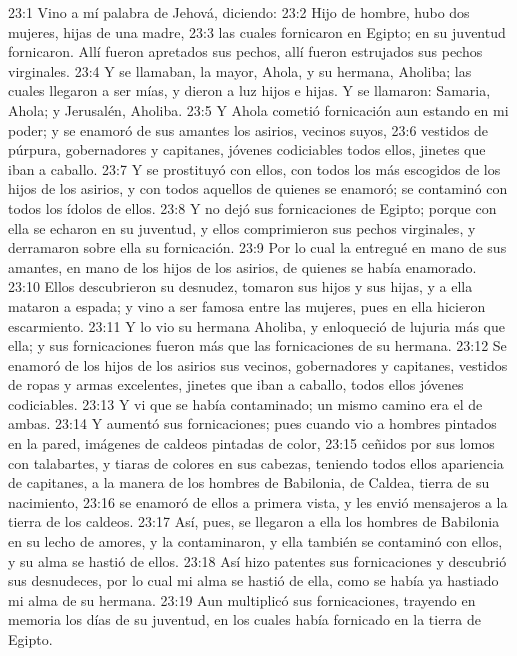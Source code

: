 23:1 Vino a mí palabra de Jehová, diciendo:   
23:2 Hijo de hombre, hubo dos mujeres, hijas de una madre,   
23:3 las cuales fornicaron en Egipto; en su juventud fornicaron. Allí fueron apretados sus pechos, allí fueron estrujados sus pechos virginales.   
23:4 Y se llamaban, la mayor, Ahola, y su hermana, Aholiba; las cuales llegaron a ser mías, y dieron a luz hijos e hijas. Y se llamaron: Samaria, Ahola; y Jerusalén, Aholiba.   
23:5 Y Ahola cometió fornicación aun estando en mi poder; y se enamoró de sus amantes los asirios, vecinos suyos,   
23:6 vestidos de púrpura, gobernadores y capitanes, jóvenes codiciables todos ellos, jinetes que iban a caballo.   
23:7 Y se prostituyó con ellos, con todos los más escogidos de los hijos de los asirios, y con todos aquellos de quienes se enamoró; se contaminó con todos los ídolos de ellos. 
23:8 Y no dejó sus fornicaciones de Egipto; porque con ella se echaron en su juventud, y ellos comprimieron sus pechos virginales, y derramaron sobre ella su fornicación.   
23:9 Por lo cual la entregué en mano de sus amantes, en mano de los hijos de los asirios, de quienes se había enamorado.   
23:10 Ellos descubrieron su desnudez, tomaron sus hijos y sus hijas, y a ella mataron a espada; y vino a ser famosa entre las mujeres, pues en ella hicieron escarmiento.   
23:11 Y lo vio su hermana Aholiba, y enloqueció de lujuria más que ella; y sus fornicaciones fueron más que las fornicaciones de su hermana.   
23:12 Se enamoró de los hijos de los asirios sus vecinos, gobernadores y capitanes, vestidos de ropas y armas excelentes, jinetes que iban a caballo, todos ellos jóvenes codiciables.   
23:13 Y vi que se había contaminado; un mismo camino era el de ambas.   
23:14 Y aumentó sus fornicaciones; pues cuando vio a hombres pintados en la pared, imágenes de caldeos pintadas de color,   
23:15 ceñidos por sus lomos con talabartes, y tiaras de colores en sus cabezas, teniendo todos ellos apariencia de capitanes, a la manera de los hombres de Babilonia, de Caldea, tierra de su nacimiento,   
23:16 se enamoró de ellos a primera vista, y les envió mensajeros a la tierra de los caldeos.   
23:17 Así, pues, se llegaron a ella los hombres de Babilonia en su lecho de amores, y la contaminaron, y ella también se contaminó con ellos, y su alma se hastió de ellos.   
23:18 Así hizo patentes sus fornicaciones y descubrió sus desnudeces, por lo cual mi alma se hastió de ella, como se había ya hastiado mi alma de su hermana.   
23:19 Aun multiplicó sus fornicaciones, trayendo en memoria los días de su juventud, en los cuales había fornicado en la tierra de Egipto.   
